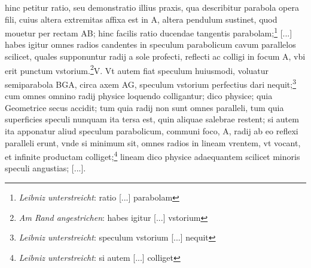 \pend \pstart [p.~97] [...] hinc petitur ratio, seu demonstratio illius praxis, qua describitur parabola opera fili, cuius altera extremitas affixa est in A, altera pendulum\protect{} sustinet, quod mouetur per rectam AB; hinc facilis ratio ducendae tangentis parabolam;\footnote{\textit{Leibniz unterstreicht}: ratio [...] parabolam} [...] habes igitur omnes radios\protect{} candentes in speculum parabolicum\protect{} cavum parallelos scilicet, quales supponuntur radij\protect{} a sole profecti, reflecti ac colligi in focum\protect{} A, vbi erit punctum\protect{} vstorium.\footnote{\textit{Am Rand angestrichen}: habes igitur [...] vstorium}\pend \pstart V. Vt autem fiat speculum\protect{} huiusmodi, voluatur semiparabola BGA, circa axem AG, speculum\protect{} vstorium perfectius dari nequit;\footnote{\textit{Leibniz unterstreicht}: speculum vstorium [...] nequit} cum omnes omnino radij physice loquendo colligantur; dico physice; quia Geometrice secus accidit; tum quia radij non sunt omnes paralleli, tum quia superficies speculi\protect{} nunquam ita tersa est, quin aliquae salebrae restent; si autem ita apponatur aliud speculum\protect{} parabolicum, communi foco\protect{}, A, radij ab eo reflexi paralleli erunt, vnde si minimum sit, omnes radios in lineam vrentem, vt vocant, et infinite productam colliget;\footnote{\textit{Leibniz unterstreicht}: si autem [...] colliget} lineam dico physice adaequantem scilicet minoris speculi\protect{} angustias; [...].